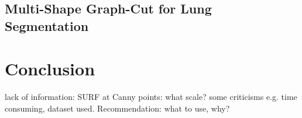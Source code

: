 \documentclass{SMBV12}
\begin{document}
\subsection{Multi-Shape Graph-Cut for Lung Segmentation}

\cite{nakagomimulti}

\section{Conclusion}

lack of information: SURF at Canny points: what scale?
some criticisms e.g. time consuming, dataset used. Recommendation: what to use, why?

%
\def\refname{Literature}





\end{document}
